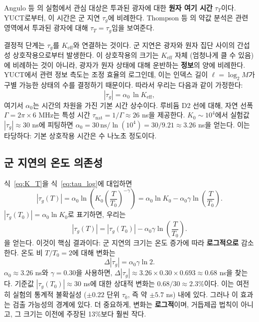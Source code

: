 \documentclass[12pt,a4paper]{article}
\newcommand{\Keff}{K_{\mathrm{eff}}}
\begin{document}
	Angulo 등 \cite{Angulo2024}의 실험에서 관심 대상은 투과된 광자에 대한 \textbf{원자 여기 시간} \(\tau_T\)이다. YUCT로부터, 이 시간은 군 지연 \(\tau_g\)에 비례한다. Thompson 등 \cite{Thompson2023}의 약값 분석은 관련 영역에서 투과된 광자에 대해 \(\tau_T = \tau_g\)임을 보여준다.
	
	결정적 단계는 \(\tau_g\)를 \(\Keff\)와 연결하는 것이다. 군 지연은 광자와 원자 집단 사이의 간섭성 상호작용으로부터 발생한다. 이 상호작용의 크기는 \(\Keff\) 자체 (엄청나게 클 수 있음)에 비례하는 것이 아니라, 광자가 원자 상태에 대해 운반하는 \textbf{정보}의 양에 비례한다. YUCT에서 관련 정보 측도는 조정 효율의 로그인데, 이는 인덱스 길이 \(\ell = \log_2 M\)가 구별 가능한 상태의 수를 결정하기 때문이다. 따라서 우리는 다음과 같이 가정한다:
	\begin{equation}
		|\tau_g| = \alpha_0 \, \ln\Keff,
		\label{eq:tau_log}
	\end{equation}
	여기서 \(\alpha_0\)는 시간의 차원을 가진 기본 시간 상수이다. 루비듐 D2 선에 대해, 자연 선폭 \(\Gamma = 2\pi \times 6\) MHz는 특성 시간 \(\tau_{\text{nat}} = 1/\Gamma \approx 26\) ns을 제공한다. \(K_0 \sim 10^4\)에서 실험값 \(|\tau_g| \approx 30\) ns에 피팅하면 \(\alpha_0 = 30\,\text{ns} / \ln(10^4) = 30 / 9.21 \approx 3.26\) ns을 얻는다. 이는 타당하다: 기본 상호작용 시간은 수 나노초 정도이다.
	
	\subsection{군 지연의 온도 의존성}
	
	식~\eqref{eq:K_T}을 식~\eqref{eq:tau_log}에 대입하면
	\begin{equation}
		|\tau_g(T)| = \alpha_0 \ln\!\left(K_0 \left(\frac{T}{T_0}\right)^{-\gamma}\right)
		= \alpha_0 \ln K_0 - \alpha_0 \gamma \ln\!\left(\frac{T}{T_0}\right).
	\end{equation}
	\(|\tau_g(T_0)| = \alpha_0 \ln K_0\)로 표기하면, 우리는
	\begin{equation}
		|\tau_g(T)| = |\tau_g(T_0)| - \alpha_0 \gamma \ln\!\left(\frac{T}{T_0}\right).
		\label{eq:tau_T_log}
	\end{equation}
	을 얻는다. 이것이 핵심 결과이다: 군 지연의 크기는 온도 증가에 따라 \textbf{로그적으로} 감소한다. 온도 비 \(T/T_0 = 2\)에 대해 변화는
	\begin{equation}
		\Delta |\tau_g| = \alpha_0 \gamma \ln 2.
	\end{equation}
	\(\alpha_0 \approx 3.26\) ns와 \(\gamma = 0.30\)을 사용하면, \(\Delta |\tau_g| \approx 3.26 \times 0.30 \times 0.693 \approx 0.68\) ns을 찾는다. 기준값 \(|\tau_g(T_0)| \approx 30\) ns에 대한 상대적 변화는 \(0.68 / 30 \approx 2.3\%\)이다. 이는 여전히 실험의 통계적 불확실성 (\(\pm 0.22\) 단위 \(\tau_0\), 즉 약 \(\pm 5.7\) ns) 내에 있다. 그러나 이 효과는 검출 가능성의 경계에 있다. 더 중요하게, 변화는 \textbf{로그적}이며, 거듭제곱 법칙이 아니고, 그 크기는 이전에 주장된 13\%보다 훨씬 작다.
	
\end{document}
